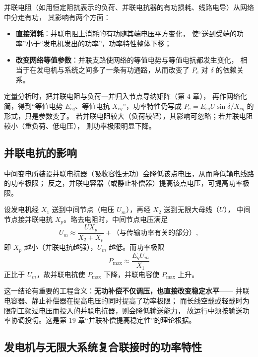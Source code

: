 并联电阻（如用恒定阻抗表示的负荷、并联电抗器的有功损耗、线路电导）从网络中分走有功，
其影响有两个方面：
\begin{itemize}
  \item \textbf{直接消耗}：并联电阻上消耗的有功随其端电压平方变化，
        使“送到受端的功率”小于“发电机发出的功率”，功率特性整体下移；
  \item \textbf{改变网络等值参数}：并联支路使网络的等值电势与等值电抗都发生变化，
        相当于在发电机与系统之间多了一条有功通路，从而改变了 $P_e$ 对 $\delta$ 的依赖关系。
\end{itemize}
定量分析时，把并联电阻与负荷一并归入节点导纳矩阵（第 4 章），
再作网络化简，得到“等值电势 $E_{eq}$、等值电抗 $X_{eq}$”，功率特性仍写成
$P_e=E_{eq}U\sin\delta/X_{eq}$ 的形式，只是参数变了。
若并联电阻较大（负荷较轻），其影响可忽略；若并联电阻较小（重负荷、低电压），
则功率极限明显下降。

\subsection{并联电抗的影响}

中间变电所装设并联电抗器（吸收容性无功）会降低该点电压，从而降低输电线路的功率极限；
反之，并联电容器（或静止补偿器）提高该点电压，可提高功率极限。

设发电机经 $X_1$ 送到中间节点（电压 $U_m$），再经 $X_2$ 送到无限大母线（$U$），
中间节点接并联电抗 $X_p$。略去电阻时，中间节点电压满足
\begin{equation}
  U_m\approx\frac{U X_p}{X_2+X_p}+\text{（与传输功率有关的部分）},
\end{equation}
即 $X_p$ 越小（并联电抗越强），$U_m$ 越低。而功率极限
\begin{equation}
  P_{\max}\approx\frac{E_qU_m}{X_1}
\end{equation}
正比于 $U_m$，故并联电抗使 $P_{\max}$ 下降，并联电容使 $P_{\max}$ 上升。

这一结论有重要的工程含义：\textbf{无功补偿不仅调压，也直接改变稳定水平}——
并联电容器、静止补偿器在提高电压的同时提高了功率极限；
而长线空载或轻载时为限制工频过电压而投入的并联电抗器，则会降低输送能力，
故运行中须按输送功率协调投切。这是第 19 章“并联补偿提高稳定性”的理论根据。

\subsection{发电机与无限大系统复合联接时的功率特性}


